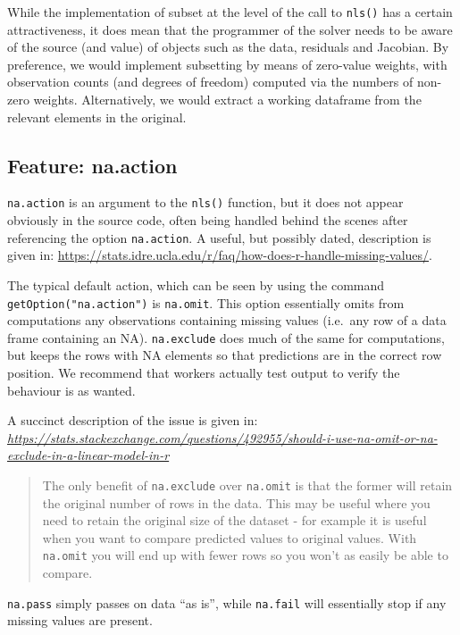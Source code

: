 \documentclass[
]{article}
\begin{document}
While the implementation of subset at the level of the call to
\texttt{nls()} has a certain attractiveness, it does mean that the
programmer of the solver needs to be aware of the source (and value) of
objects such as the data, residuals and Jacobian. By preference, we
would implement subsetting by means of zero-value weights, with
observation counts (and degrees of freedom) computed via the numbers of
non-zero weights. Alternatively, we would extract a working dataframe
from the relevant elements in the original.

\hypertarget{feature-na.action}{%
\subsection{Feature: na.action}\label{feature-na.action}}

\texttt{na.action} is an argument to the \texttt{nls()} function, but it
does not appear obviously in the source code, often being handled behind
the scenes after referencing the option \texttt{na.action}. A useful,
but possibly dated, description is given in:
\url{https://stats.idre.ucla.edu/r/faq/how-does-r-handle-missing-values/}.

The typical default action, which can be seen by using the command
\texttt{getOption("na.action")} is \texttt{na.omit}. This option
essentially omits from computations any observations containing missing
values (i.e.~any row of a data frame containing an NA).
\texttt{na.exclude} does much of the same for computations, but keeps
the rows with NA elements so that predictions are in the correct row
position. We recommend that workers actually test output to verify the
behaviour is as wanted.

A succinct description of the issue is given in:
\emph{\url{https://stats.stackexchange.com/questions/492955/should-i-use-na-omit-or-na-exclude-in-a-linear-model-in-r}}

\begin{quote}
The only benefit of \texttt{na.exclude} over \texttt{na.omit} is that
the former will retain the original number of rows in the data. This may
be useful where you need to retain the original size of the dataset -
for example it is useful when you want to compare predicted values to
original values. With \texttt{na.omit} you will end up with fewer rows
so you won't as easily be able to compare.
\end{quote}

\texttt{na.pass} simply passes on data ``as is'', while \texttt{na.fail}
will essentially stop if any missing values are present.
\end{document}
